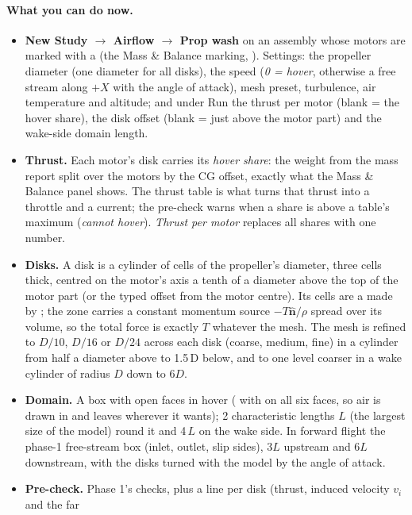 \paragraph{What you can do now.}
\begin{itemize}[nosep]
  \item \textbf{New Study $\to$ Airflow $\to$ Prop wash} on an assembly whose motors are marked with a
         (the Mass \& Balance marking, ). Settings: the propeller diameter (one
        diameter for all disks), the speed (\emph{0 = hover}, otherwise a free stream along $+X$ with the angle of
        attack), mesh preset, turbulence, air temperature and altitude; and under Run the thrust per motor (blank
        = the hover share), the disk offset (blank = just above the motor part) and the wake-side domain length.
  \item \textbf{Thrust.} Each motor's disk carries its \emph{hover share}: the weight from the mass report
        split over the motors by the CG offset, exactly what the Mass \& Balance panel shows. The thrust table is what turns that thrust
        into a throttle and a current; the pre-check warns when a share is above a table's maximum
        (\emph{cannot hover}). \emph{Thrust per motor} replaces all shares with one number.
  \item \textbf{Disks.} A disk is a cylinder of cells of the propeller's diameter, three cells thick, centred on
        the motor's axis a tenth of a diameter above the top of the motor part (or the typed offset from the
        motor centre). Its cells are a  made by ; the zone carries a constant
        momentum source $-T\hat{\mathbf n}/\rho$ spread over its volume, so the total force is exactly $T$
        whatever the mesh. The mesh is refined to $D/10$, $D/16$ or $D/24$ across each disk (coarse, medium,
        fine) in a cylinder from half a diameter above to 1.5\,D below, and to one level coarser in a wake
        cylinder of radius $D$ down to $6D$.
  \item \textbf{Domain.} A box with open faces in hover ( with
         on all six faces, so air is drawn in and leaves wherever it wants);
        2 characteristic lengths $L$ (the largest size of the model) round it and 4\,$L$ on the wake side.
        In forward flight the phase-1 free-stream box (inlet, outlet, slip sides), $3L$ upstream and $6L$
        downstream, with the disks turned with the model by the angle of attack.
  \item \textbf{Pre-check.} Phase 1's checks, plus a line per disk (thrust, induced velocity $v_i$ and the far

\end{itemize}
